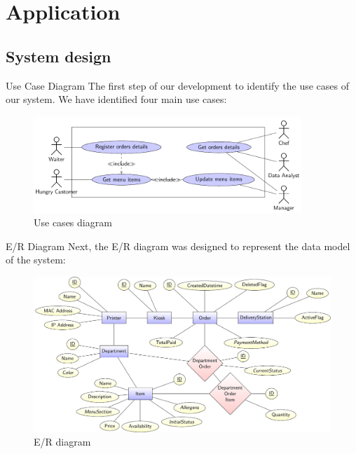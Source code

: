 

\section[Application]{Application}

\subsection[System design]{System design}

\begin{frame}{Use Case Diagram}
	The first step of our development to identify the use cases of our system.
	We have identified four main use cases:

	\begin{figure}[h!]
		\centering
		\includegraphics[width=0.9\textwidth,height=0.55\textheight,keepaspectratio]{images/usecases}
		\vspace*{-1\baselineskip}
		\caption{Use cases diagram}
		\label{fig:usecases}
	\end{figure}

\end{frame}

\begin{frame}{E/R Diagram}
	Next, the E/R diagram was designed to represent the data model of the
	system:

	\begin{figure}[h!]
		\centering
		\includegraphics[width=\textwidth,height=0.6\textheight,keepaspectratio]{images/er}
		\caption{E/R diagram}
		\label{fig:er}
	\end{figure}

\end{frame}

